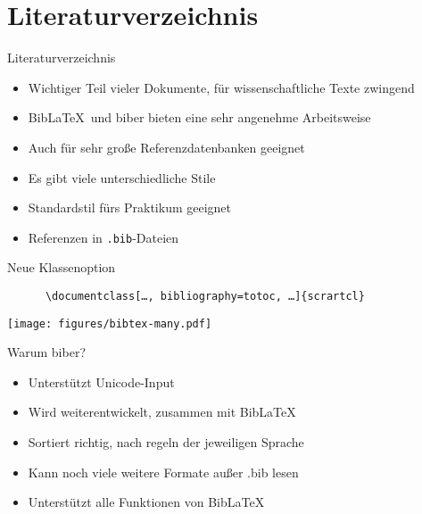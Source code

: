 \section{Literaturverzeichnis}

\begin{frame}[fragile]{Literaturverzeichnis}
  \begin{itemize}
    \item Wichtiger Teil vieler Dokumente, für wissenschaftliche Texte zwingend
    \item Bib\LaTeX\ und biber bieten eine sehr angenehme Arbeitsweise
    \item Auch für sehr große Referenzdatenbanken geeignet
    \item Es gibt viele unterschiedliche Stile
    \item Standardstil fürs Praktikum geeignet
    \item Referenzen in \texttt{.bib}-Dateien
  \end{itemize}
  \begin{tblock}{Neue Klassenoption}
    \begin{lstlisting}
      \documentclass[…, bibliography=totoc, …]{scrartcl}
    \end{lstlisting}
  \end{tblock}
\end{frame}

\begin{frame}
  \centering
  \texttt{[image: figures/bibtex-many.pdf]}
\end{frame}

\begin{frame}{Warum biber?}
  \begin{itemize}
    \item Unterstützt Unicode-Input
    \item Wird weiterentwickelt, zusammen mit Bib\LaTeX
    \item Sortiert richtig, nach regeln der jeweiligen Sprache
    \item Kann noch viele weitere Formate außer .bib lesen
    \item Unterstützt alle Funktionen von Bib\LaTeX
  \end{itemize}
\end{frame}

